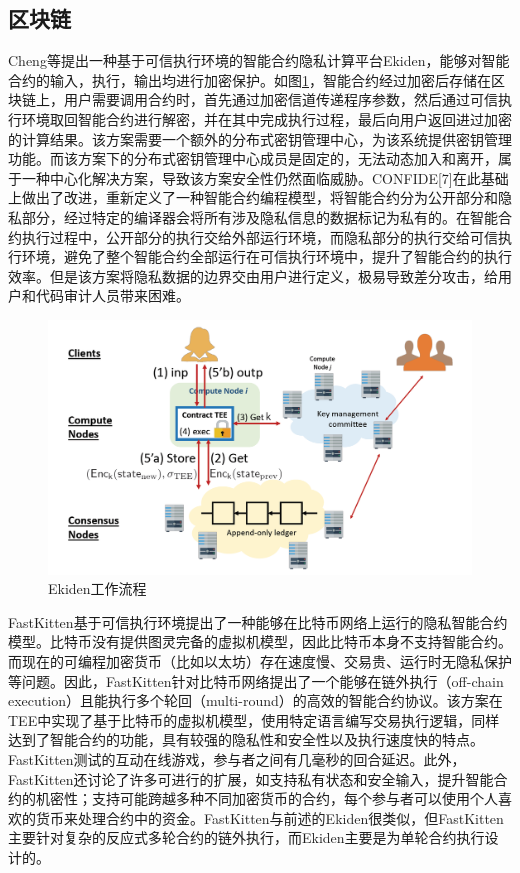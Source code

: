 \documentclass[twocolumn]{source/Paper}
\begin{document}
        \subsection{区块链}
        Cheng\cite{cheng2019ekiden}等提出一种基于可信执行环境的智能合约隐私计算平台Ekiden，能够对智能合约的输入，执行，输出均进行加密保护。如图\ref{ekiden}，智能合约经过加密后存储在区块链上，用户需要调用合约时，首先通过加密信道传递程序参数，然后通过可信执行环境取回智能合约进行解密，并在其中完成执行过程，最后向用户返回进过加密的计算结果。该方案需要一个额外的分布式密钥管理中心，为该系统提供密钥管理功能。而该方案下的分布式密钥管理中心成员是固定的，无法动态加入和离开，属于一种中心化解决方案，导致该方案安全性仍然面临威胁。CONFIDE[7]在此基础上做出了改进，重新定义了一种智能合约编程模型，将智能合约分为公开部分和隐私部分，经过特定的编译器会将所有涉及隐私信息的数据标记为私有的。在智能合约执行过程中，公开部分的执行交给外部运行环境，而隐私部分的执行交给可信执行环境，避免了整个智能合约全部运行在可信执行环境中，提升了智能合约的执行效率。但是该方案将隐私数据的边界交由用户进行定义，极易导致差分攻击，给用户和代码审计人员带来困难。

        \begin{figure}[H]
            \centering
            \includegraphics[width=0.7\linewidth]{pic/ekiden.png}
            \caption{Ekiden工作流程}
            \label{ekiden}
        \end{figure}


        FastKitten\cite{das2019fastkitten}基于可信执行环境提出了一种能够在比特币网络上运行的隐私智能合约模型。比特币没有提供图灵完备的虚拟机模型，因此比特币本身不支持智能合约。而现在的可编程加密货币（比如以太坊）存在速度慢、交易贵、运行时无隐私保护等问题。因此，FastKitten针对比特币网络提出了一个能够在链外执行（off-chain execution）且能执行多个轮回（multi-round）的高效的智能合约协议。该方案在TEE中实现了基于比特币的虚拟机模型，使用特定语言编写交易执行逻辑，同样达到了智能合约的功能，具有较强的隐私性和安全性以及执行速度快的特点。FastKitten测试的互动在线游戏，参与者之间有几毫秒的回合延迟。此外，FastKitten还讨论了许多可进行的扩展，如支持私有状态和安全输入，提升智能合约的机密性；支持可能跨越多种不同加密货币的合约，每个参与者可以使用个人喜欢的货币来处理合约中的资金。FastKitten与前述的Ekiden很类似，但FastKitten主要针对复杂的反应式多轮合约的链外执行，而Ekiden主要是为单轮合约执行设计的。
        
\end{document}
